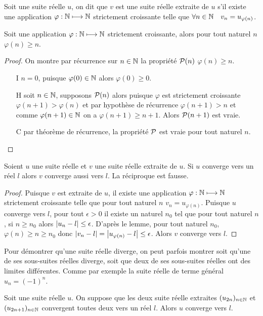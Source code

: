 \begin{defdef}
  Soit une suite réelle $u$, on dit que $v$ est une suite réelle extraite de $u$ s'il existe une application $\varphi:\N \longmapsto \N$ strictement croissante telle que $\forall n\in \N \quad v_n=u_{\varphi(n)}$.
\end{defdef}
\begin{lemme}
  Soit une application $\varphi:\N \longmapsto \N$ strictement croissante, alors pour tout naturel $n$ $\varphi(n) \geq n$.
\end{lemme}
\begin{proof}
  On montre par récurrence sur $n \in \N$ la propriété $\P(n)$ $\varphi(n) \geq n$.
  \begin{itemize}
  \item[I] $n=0$, puisque $\varphi(0) \in \N$ alors $\varphi(0) \geq 0$.
  \item[H] soit $n \in \N$, supposons $\P(n)$ alors puisque $\varphi$ est strictement croissante $\varphi(n+1) > \varphi(n)$ et par hypothèse de récurrence $\varphi(n+1) > n$ et comme $\varphi(n+1) \in \N$ on a $\varphi(n+1) \geq n+1$. Alors $\P(n+1)$ est vraie.
  \item[C] par théorème de récurrence, la propriété $\P$ est vraie pour tout naturel $n$.
  \end{itemize}
\end{proof}
\begin{prop}
  Soient $u$ une suite réelle et $v$ une suite réelle extraite de $u$. Si $u$ converge vers un réel $l$ alors $v$ converge aussi vers $l$. La réciproque est fausse.
\end{prop}
\begin{proof}
  Puisque $v$ est extraite de $u$, il existe une application $\varphi:\N \longmapsto \N$ strictement croissante telle que pour tout naturel $n$ $v_n=u_{\varphi(n)}$. Puisque $u$ converge vers $l$, pour tout $\epsilon>0$ il existe un naturel $n_0$ tel que pour tout naturel $n$, si $n \geq n_0$ alors $\abs{u_n-l} \leq \epsilon$. D'après le lemme, pour tout naturel $n_0$, $\varphi(n) \geq n \geq n_0$ donc $\abs{v_n-l}=\abs{u_{\varphi(n)}-l} \leq \epsilon$. Alors $v$ converge vers $l$.
\end{proof}
Pour démontrer qu'une suite réelle diverge, on peut parfois montrer soit qu'une de ses sous-suites réelles diverge, soit que deux de ses sous-suites réelles ont des limites différentes. Comme par exemple la suite réelle de terme général $u_n=(-1)^n$.
\begin{prop}
  Soit une suite réelle $u$. On suppose que les deux suite réelle extraites $(u_{2n})_{n \in \N}$ et $(u_{2n+1})_{n \in \N}$ convergent toutes deux vers un réel $l$. Alors $u$ converge vers $l$.
\end{prop}
